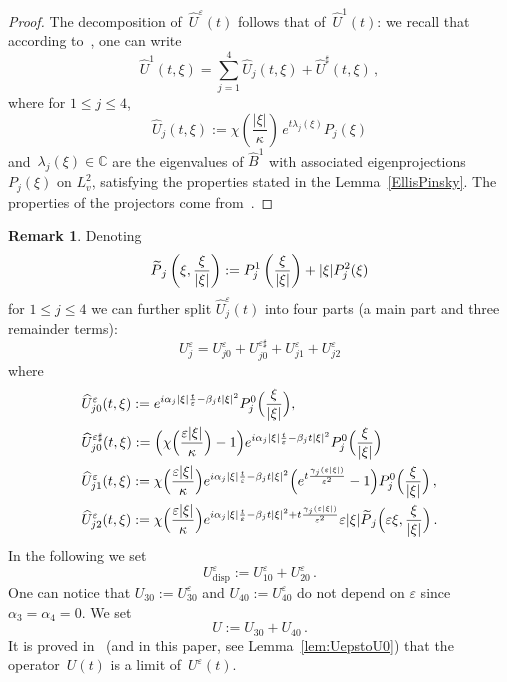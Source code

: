 \documentclass[11pt]{article}
\theoremstyle{definition}
\newtheorem{rema}[theo]{Remark}
\numberwithin{equation}{section}
\numberwithin{figure}{section}
\numberwithin{table}{section}
\newcommand*\bC {\mathbb{C}}
\newcommand*\eps{{\varepsilon}}
\newcommand*\e{{\varepsilon}}
\DeclareMathOperator{\disp}{disp}
\let\oldtilde\tilde
\renewcommand*{\tilde}[1]{\mathchoice{\widetilde{#1}}{\widetilde{#1}}{\oldtilde{#1}}{\oldtilde{#1}}}
\begin{document}
\begin{proof}
The decomposition of~$\widehat U^\eps(t)$ follows that of~$\widehat U^1(t)$: we recall that according to~\cite{Ellis-Pinsky}, one can write
\[
\widehat U^1(t,\xi) = \sum_{j=1}^4 \widehat U _j(t,\xi) + \widehat U^{\sharp}(t,\xi) \,,
\]
where for $1 \le j \le 4$,
\[
\widehat U _j(t,\xi) := \chi\left(\frac{|\xi|}\kappa\right) \, e^{t \lambda_j(\xi)} P_j(\xi)
\]
and~$\lambda_j(\xi) \in \bC$ are the eigenvalues of $\widehat B^1$ with associated eigenprojections $P_j(\xi)$ on $L^2_v$, satisfying the properties stated in the Lemma~\ref{EllisPinsky}. The properties of the projectors come from~\cite{Bardos-Ukai, Ellis-Pinsky}.
\end{proof}

\begin{rema}\label{defU}
Denoting
\begin{equation}\label{deftildeP1j}
\tilde P_j \left(\xi, \frac{\xi}{|\xi|}\right) := P_{j}^1\left(\frac{\xi}{|\xi|}\right) + |\xi| P_{j}^2(\xi)
\end{equation}
for $1 \le j \le 4$ we can further split $\widehat U^\eps_j(t)$ into four parts (a main part and three remainder terms):
\[
U^\eps_j = U^\eps_{j0} + U^{\eps\sharp}_{j0} + U^\eps_{j1} + U^\eps_{j2}
\]
where
\begin{align*}
&\widehat U^\eps_{j0}(t,\xi) := e^{i\alpha_j |\xi|\frac{t}{\eps} - \beta_j t |\xi|^2} P_{j}^0\Big(\frac{\xi}{|\xi|}\Big), \\
&\widehat U^{\eps\sharp}_{j0}(t,\xi) := \Big(\chi\Big (\frac{\eps|\xi|}\kappa\Big)-1\Big) e^{i\alpha_j |\xi|\frac{t}{\eps} - \beta_j t |\xi|^2}P_{j}^0\Big(\frac{\xi}{|\xi|}\Big)\\
&\widehat U^\eps_{j1}(t,\xi) := \chi\Big (\frac{\eps|\xi|}\kappa\Big) e^{i\alpha_j |\xi|\frac{t}{\eps} - \beta_j t |\xi|^2} \Big(e^{t \frac{\gamma_j(\eps|\xi|)}{\eps^2}}-1 \Big)P_{j}^0\Big(\frac{\xi}{|\xi|}\Big)\,, \\
&\widehat U^\eps_{j2}(t,\xi) := \chi\Big (\frac{\eps|\xi|}\kappa\Big) e^{i\alpha_j |\xi|\frac{t}{\eps} - \beta_j t |\xi|^2+ t \frac{\gamma_j(\eps|\xi|)}{\eps^2}} \eps |\xi|\tilde P_{j} \Big(\eps \xi, \frac{\xi}{|\xi|}\Big)
\,.
\end{align*}
In the following we set
\[
U^\e_{\disp}:=U^\eps_{10} + U^\eps_{20} \,.
\]
One can notice that $U_{30}:=U^\eps_{30}$ and $U_{40}:=U^\eps_{40}$ do not depend on $\eps$ since $\alpha_3=\alpha_4=0$. We set
\[
U := U_{30} + U_{40}\,.
\]
It is proved in~\cite{Bardos-Ukai} (and in this paper, see Lemma~\ref{lem:UepstoU0}) that the operator~$U(t)$ is a limit of~$U^\e(t)$.
\end{rema}
\end{document}
